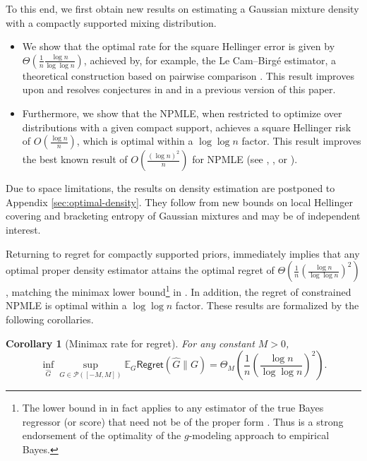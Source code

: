 \documentclass[letterpaper,11pt]{article}
\newcommand{\pth}[1]{\left( #1 \right)}
\newtheorem{corollary}[theorem]{Corollary}
\theoremstyle{definition}
\newcommand{\Regret}{\mathsf{Regret}}
\renewcommand{\hat}{\widehat}
\begin{document}
To this end, we first obtain new results on estimating a Gaussian mixture density with a
compactly supported mixing distribution. 
\begin{itemize}
	\item 
We show that the optimal rate for the square Hellinger error is given by $\Theta(\frac{1}{n} \frac{\log n}{\log\log n})$, achieved by, for example, the Le Cam--Birg\'e estimator, a theoretical construction based on pairwise comparison \cite{Birge83}.
This result improves upon \cite{NW21} and resolves conjectures in \cite{jia.polyanskiy.wu.2023} and in a previous
version of this paper.

\item
Furthermore, we show that the NPMLE, when restricted to optimize over distributions with a
given compact support, achieves a square Hellinger risk of $O (\frac{\log n} {n})$, which
is optimal within a $\log \log n$ factor. This result improves the best known result of
$O(\frac{(\log n)^2}{n})$ for NPMLE (see \cite[Theorem 4.1]{ghosal.vdv}, \cite[Theorem
1]{Zhang_2009}, or \cite[Theorem 6]{PW20-npmle}).
\end{itemize}
Due to space limitations, the results on density estimation are postponed to Appendix \ref{sec:optimal-density}. They follow from new bounds on local Hellinger covering and bracketing entropy of Gaussian mixtures and may be of independent interest.


Returning to regret for compactly supported priors, 
immediately implies that any optimal proper density estimator attains the optimal regret
of $\Theta(\frac{1}{n} (\frac{\log n}{\log\log n})^2)$, matching the minimax lower
bound\footnote{The lower bound in \cite[Theorem 1] {polyanskiy2021sharp} in fact applies
to any estimator of the true Bayes regressor (or score) that need not be of the proper
form . Thus  is a strong endorsement of
the optimality of the $g$-modeling approach to empirical Bayes.} in \cite[Theorem
1]{polyanskiy2021sharp}. In addition, the regret of constrained NPMLE is optimal within a
$\log \log n$ factor. These results are formalized by the following corollaries.





\begin{corollary}[Minimax rate for regret]
\label{cor:lcb-regret}
For any constant $M>0$,
\[
\inf_{\hat G} \sup_{G\in\mathcal P([-M,M])} \mathbb E_G \Regret(\hat G\|G) = \Theta_M
\pth{
\frac{1}{n}
\left(\frac{\log n}{\log\log n}\right)^2
}.
\]
\end{corollary}
\end{document}

